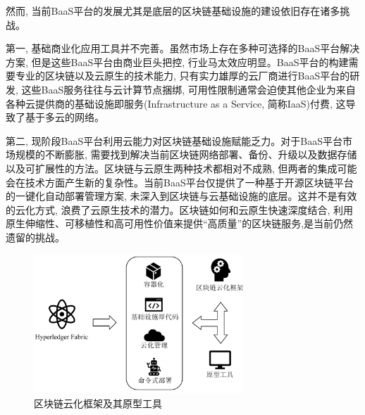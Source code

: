 然而, 当前BaaS平台的发展尤其是底层的区块链基础设施的建设依旧存在诸多挑战。

第一, 基础商业化应用工具并不完善\footnotemark[2]。虽然市场上存在多种可选择的BaaS平台解决方案, 但是这些BaaS平台由商业巨头把控, 行业马太效应明显\cite{KuernetesbasedFabricChaincodeManagementAndHihgAvailabilityTechnology}。BaaS平台的构建需要专业的区块链以及云原生的技术能力, 只有实力雄厚的云厂商进行BaaS平台的研发, 这些BaaS服务往往与云计算节点捆绑, 可用性限制通常会迫使其他企业为来自各种云提供商的基础设施即服务(Infrastructure as a Service, 简称IaaS)付费, 这导致了基于多云的网络\cite{DBLP:conf/coins/GerritsKKFV21}。

第二, 现阶段BaaS平台利用云能力对区块链基础设施赋能乏力。对于BaaS平台市场规模的不断膨胀, 需要找到解决当前区块链网络部署、备份、升级以及数据存储以及可扩展性的方法。区块链与云原生两种技术都相对不成熟, 但两者的集成可能会在技术方面产生新的复杂性\cite{onik2019performance}。当前BaaS平台仅提供了一种基于开源区块链平台的一键化自动部署管理方案, 未深入到区块链与云基础设施的底层。这并不是有效的云化方式, 浪费了云原生技术的潜力。区块链如何和云原生快速深度结合, 利用原生伸缩性、可移植性和高可用性价值来提供“高质量”的区块链服务,是当前仍然遗留的挑战。

\begin{figure}[h] %
    \centering %
    \includegraphics[width=0.7\textwidth]{FIGs/chapter1/framework_tool.pdf} %
    \caption{区块链云化框架及其原型工具} %
    \label{framework_tool} %
\end{figure}%

